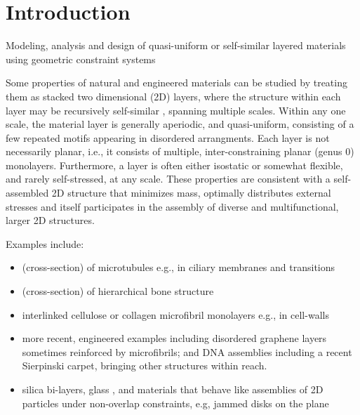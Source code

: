 \section{Introduction}
Modeling, analysis and design of quasi-uniform or self-similar layered materials using geometric constraint systems
 

Some properties of natural and engineered materials can be studied by treating them as stacked two dimensional (2D) layers, 
where the structure within each layer may be recursively 
self-similar \cite{Intro1}, 
spanning multiple scales. Within any one scale, the material layer is generally aperiodic, and quasi-uniform,
consisting of a few repeated motifs appearing in disordered arrangments.
Each layer is not necessarily planar, i.e., it consists of multiple, inter-constraining planar (genus 0) monolayers. 
Furthermore, a layer is often   either isostatic or somewhat flexible, and rarely self-stressed, at any scale. These properties are
consistent with a self-assembled 2D structure that minimizes mass, optimally distributes external stresses and itself 
participates in the assembly of diverse and multifunctional, 
larger 2D structures.

Examples include:

\begin{itemize}
    
    \item (cross-section) of microtubules \cite{Necklace1} e.g., in ciliary membranes and transitions \cite{Necklace2}
    
    \item (cross-section) of hierarchical bone structure \cite{XX}
    
    \item interlinked cellulose or collagen microfibril monolayers e.g., in cell-walls \cite{CellWalls1} \cite{CellWalls1}
    
    \item more recent, engineered examples including  disordered graphene layers \cite{Graphene1} \cite{Graphene2} sometimes reinforced 
    by  microfibrils; and DNA assemblies \cite{Microfibrils1} including a recent Sierpinski carpet, bringing other structures 
    \cite{Microfibrils2} within reach.
    
    \item  silica bi-layers, glass \cite{SilicaGlass1} \cite{SilicaGlass2}, and materials that behave like assemblies of 
    2D particles under non-overlap constraints, e.g, jammed 
    disks on the plane \cite{JammedDisk1}

   
\end{itemize}


